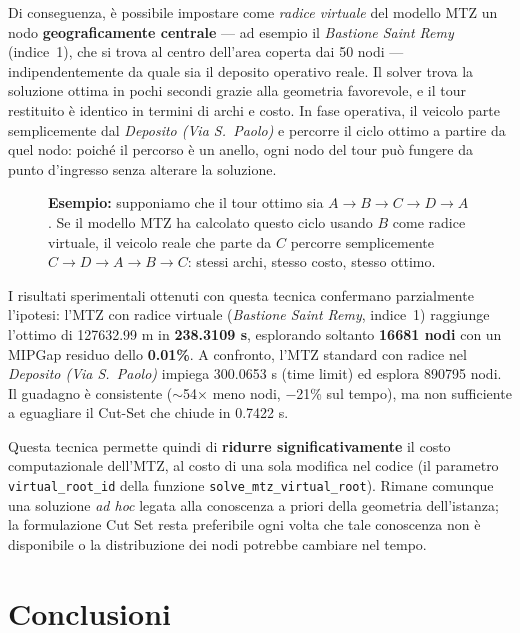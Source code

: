 \documentclass[a4paper,12pt]{article}
\begin{document}
Di conseguenza, è possibile impostare come \textit{radice virtuale} del modello MTZ un nodo \textbf{geograficamente centrale} — ad esempio il \textit{Bastione Saint Remy} (indice~1), che si trova al centro dell'area coperta dai 50 nodi — indipendentemente da quale sia il deposito operativo reale. Il solver trova la soluzione ottima in pochi secondi grazie alla geometria favorevole, e il tour restituito è identico in termini di archi e costo. In fase operativa, il veicolo parte semplicemente dal \textit{Deposito (Via S.~Paolo)} e percorre il ciclo ottimo a partire da quel nodo: poiché il percorso è un anello, ogni nodo del tour può fungere da punto d'ingresso senza alterare la soluzione.

\begin{figure}[H]
\centering
\begin{minipage}{0.85\textwidth}
\small
\textbf{Esempio:} supponiamo che il tour ottimo sia $A \to B \to C \to D \to A$. Se il modello MTZ ha calcolato questo ciclo usando $B$ come radice virtuale, il veicolo reale che parte da $C$ percorre semplicemente $C \to D \to A \to B \to C$: stessi archi, stesso costo, stesso ottimo.
\end{minipage}
\end{figure}

I risultati sperimentali ottenuti con questa tecnica confermano parzialmente l'ipotesi: l'MTZ con radice virtuale (\textit{Bastione Saint Remy}, indice~1) raggiunge l'ottimo di 127632.99 m in \textbf{238.3109 s}, esplorando soltanto \textbf{16681 nodi} con un MIPGap residuo dello \textbf{0.01\%}. A confronto, l'MTZ standard con radice nel \textit{Deposito (Via S.~Paolo)} impiega 300.0653 s (time limit) ed esplora 890795 nodi. Il guadagno è consistente ($\sim$54× meno nodi, $-$21\% sul tempo), ma non sufficiente a eguagliare il Cut-Set che chiude in 0.7422 s.

Questa tecnica permette quindi di \textbf{ridurre significativamente} il costo computazionale dell'MTZ, al costo di una sola modifica nel codice (il parametro \texttt{virtual\_root\_id} della funzione \texttt{solve\_mtz\_virtual\_root}). Rimane comunque una soluzione \textit{ad hoc} legata alla conoscenza a priori della geometria dell'istanza; la formulazione Cut Set resta preferibile ogni volta che tale conoscenza non è disponibile o la distribuzione dei nodi potrebbe cambiare nel tempo.

\section{Conclusioni}
\end{document}
